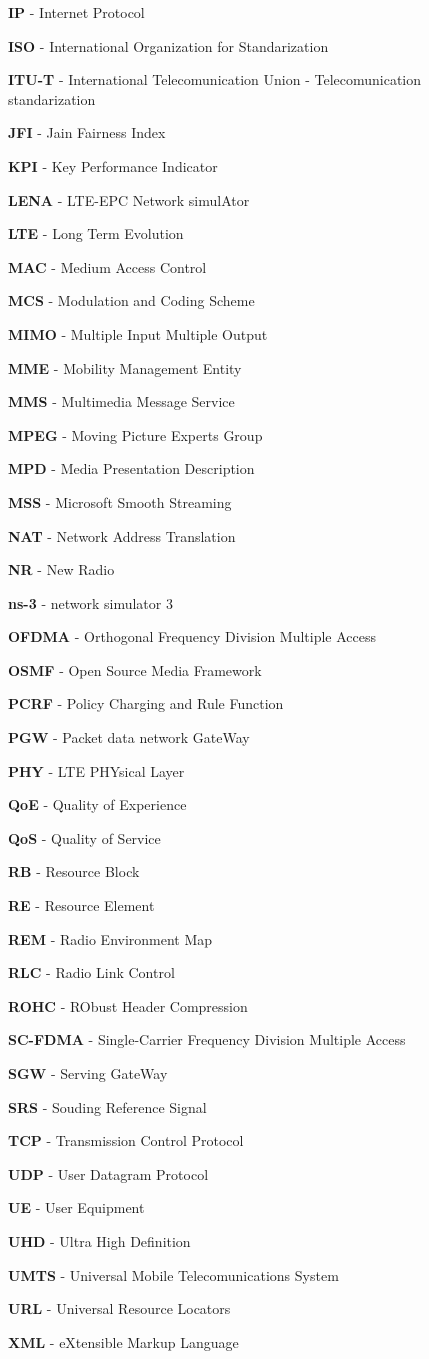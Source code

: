 \textbf{IP} - Internet Protocol

\textbf{ISO} - International Organization for Standarization

\textbf{ITU-T} - International Telecomunication Union - Telecomunication standarization

\textbf{JFI} - Jain Fairness Index

\textbf{KPI} - Key Performance Indicator

\textbf{LENA} - LTE-EPC Network simulAtor

\textbf{LTE} - Long Term Evolution

\textbf{MAC} - Medium Access Control

\textbf{MCS} - Modulation and Coding Scheme

\textbf{MIMO} - Multiple Input Multiple Output

\textbf{MME} - Mobility Management Entity

\textbf{MMS} - Multimedia Message Service

\textbf{MPEG} - Moving Picture Experts Group

\textbf{MPD} - Media Presentation Description

\textbf{MSS} - Microsoft Smooth Streaming

\textbf{NAT} - Network Address Translation

\textbf{NR} - New Radio

\textbf{ns-3} - network simulator 3

\textbf{OFDMA} - Orthogonal Frequency Division Multiple Access

\textbf{OSMF} - Open Source Media Framework

\textbf{PCRF} - Policy Charging and Rule Function

\textbf{PGW} - Packet data network GateWay

\textbf{PHY} - LTE PHYsical Layer

\textbf{QoE} - Quality of Experience

\textbf{QoS} - Quality of Service

\textbf{RB} - Resource Block

\textbf{RE} - Resource Element

\textbf{REM} - Radio Environment Map

\textbf{RLC} - Radio Link Control

\textbf{ROHC} - RObust Header Compression

\textbf{SC-FDMA} - Single-Carrier Frequency Division Multiple Access

\textbf{SGW} - Serving GateWay

\textbf{SRS} - Souding Reference Signal

\textbf{TCP} - Transmission Control Protocol

\textbf{UDP} - User Datagram Protocol

\textbf{UE} - User Equipment

\textbf{UHD} - Ultra High Definition

\textbf{UMTS} - Universal Mobile Telecomunications System

\textbf{URL} - Universal Resource Locators

\textbf{XML} - eXtensible Markup Language


\cleardoublepage
